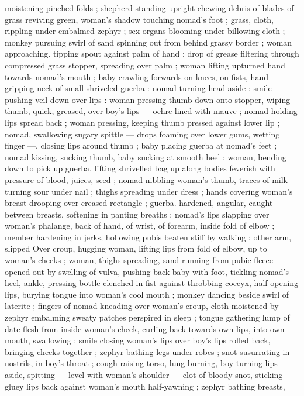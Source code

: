 moistening pinched folds ; shepherd standing upright chewing debris
of blades of grass reviving green, woman's shadow touching
nomad’s foot ; grass, cloth, rippling under embalmed zephyr ; sex
organs blooming under billowing cloth ; monkey pursuing swirl of
sand spinning out from behind grassy border ; woman approaching.
tipping spout against palm of hand : drop of grease filtering through
compressed grass stopper, spreading over palm ; woman lifting
upturned hand towards nomad’s mouth ; baby crawling forwards on
knees, on fists, hand gripping neck of small shriveled guerba :
nomad turning head aside : smile pushing veil down over lips :
woman pressing thumb down onto stopper, wiping thumb, quick,
greased, over boy's lips --- ochre lined with mauve ; nomad holding
lips spread back ; woman pressing, keeping thumb pressed against
lower lip ; nomad, swallowing sugary spittle --- drops foaming over
lower gums, wetting finger ---, closing lips around thumb ; baby
placing guerba at nomad's feet ; nomad kissing, sucking thumb, baby
sucking at smooth heel : woman, bending down to pick up guerba,
lifting shrivelled bag up along bodies feverish with pressure of
blood, juices, seed ; nomad nibbling woman's thumb, traces of milk
turning sour under nail ; thighs spreading under dress ; hands
covering woman's breast drooping over creased rectangle ; guerba.
hardened, angular, caught between breasts, softening in panting
breaths ; nomad's lips slapping over woman's phalange, back of
hand, of wrist, of forearm, inside fold of elbow ; member hardening
in jerks, hollowing pubis beaten stiff by walking ; other arm, slipped
Over croup, hugging woman, lifting lips from fold of elbow, up to
woman's cheeks ; woman, thighs spreading, sand running from pubic
fleece opened out by swelling of vulva, pushing back baby with foot,
tickling nomad’s heel, ankle, pressing bottle clenched in fist against
throbbing coccyx, half-opening lips, burying tongue into woman's
cool mouth ; monkey dancing beside swirl of laterite ; fingers of
nomad kneading over woman's croup, cloth moistened by zephyr
embalming sweaty patches perspired in sleep ; tongue gathering
lump of date-flesh from inside woman's cheek, curling back towards
own lips, into own mouth, swallowing : smile closing woman's lips
over boy's lips rolled back, bringing cheeks together ; zephyr bathing
legs under robes ; snot susurrating in nostrils, in boy's throat ; cough
raising torso, lung burning, boy turning lips aside, spitting --- level
with woman's shoulder --- clot of bloody snot, sticking gluey lips
back against woman's mouth half-yawning ; zephyr bathing breasts,
